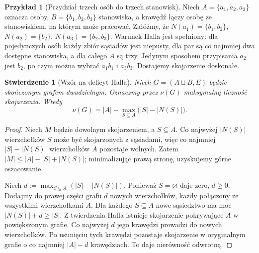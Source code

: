\documentclass[11pt,a4paper]{report}
\numberwithin{equation}{section}
\theoremstyle{plain}
\newtheorem{stwierdzenie}[twierdzenie]{Stwierdzenie}
\theoremstyle{definition}
\newtheorem{przyklad}[twierdzenie]{Przykład}
\theoremstyle{remark}
\begin{document}
\begin{przyklad}[Przydział trzech osób do trzech stanowisk]
Niech $A=\{a_1,a_2,a_3\}$ oznacza osoby,
$B=\{b_1,b_2,b_3\}$ stanowiska, a krawędź
łączy osobę ze stanowiskiem, na którym może pracować.
Załóżmy, że $N(a_1)=\{b_1,b_2\}$,
$N(a_2)=\{b_2\}$, $N(a_3)=\{b_2,b_3\}$.
Warunek Halla jest spełniony: dla pojedynczych osób
każdy zbiór sąsiadów jest niepusty, dla par są
co najmniej dwa dostępne stanowiska, a dla całego $A$
są trzy. Jedynym sposobem przypisania $a_2$ jest
$b_2$, po czym można wybrać $a_1b_1$ i $a_3b_3$.
Dostajemy skojarzenie doskonałe.
\end{przyklad}

\begin{center}
\end{center}

\begin{stwierdzenie}[Wzór na deficyt Halla]
\label{prop:tg-hall-def}
Niech $G=(A\sqcup B,E)$ będzie skończonym grafem
dwudzielnym. Oznaczmy przez $\nu(G)$ maksymalną
liczność skojarzenia. Wtedy
\[
\nu(G)=|A|-\max_{S\subseteq A}\bigl(|S|-|N(S)|\bigr).
\]
\end{stwierdzenie}

\begin{proof}
Niech $M$ będzie dowolnym skojarzeniem, a $S\subseteq A$.
Co najwyżej $|N(S)|$ wierzchołków $S$ może być
skojarzonych z sąsiadami, więc co najmniej
$|S|-|N(S)|$ wierzchołków $A$ pozostaje wolnych.
Zatem $|M|\le|A|-|S|+|N(S)|$; minimalizując
prawą stronę, uzyskujemy górne oszacowanie.

Niech $d:=\max_{S\subseteq A}(|S|-|N(S)|)$.
Ponieważ $S=\varnothing$ daje zero, $d\ge0$.
Dodajmy do prawej części grafu $d$ nowych
wierzchołków, każdy połączony ze wszystkimi
wierzchołkami $A$. Dla każdego $S\subseteq A$
nowe sąsiedztwo ma moc $|N(S)|+d\ge|S|$.
Z twierdzenia Halla istnieje skojarzenie
pokrywające $A$ w powiększonym grafie.
Co najwyżej $d$ jego krawędzi prowadzi do nowych
wierzchołków. Po usunięciu tych krawędzi
pozostaje skojarzenie w oryginalnym grafie
o co najmniej $|A|-d$ krawędziach.
To daje nierówność odwrotną.
\end{proof}
\end{document}
